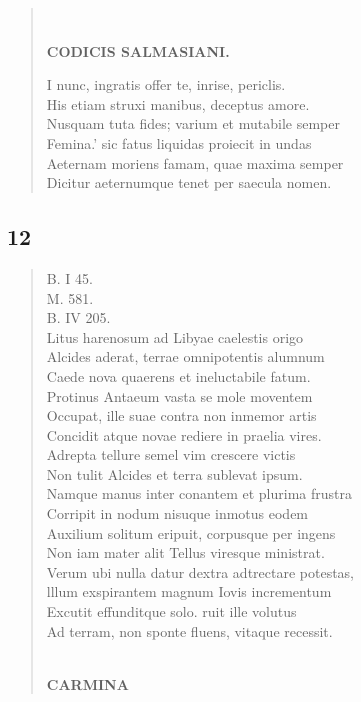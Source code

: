 \documentclass[11pt, a4paper]{report}
\begin{document}
\begin{verse}
        ﻿\pagebreak 
    \begin{center} \textbf{CODICIS SALMASIANI.} \end{center} \marginpar{[47]} I nunc, ingratis offer te, inrise, periclis. \\ His etiam struxi manibus, deceptus amore. \\ Nusquam tuta fides; varium et mutabile semper \\ Femina.’ sic fatus liquidas proiecit in undas \\ Aeternam moriens famam, quae maxima semper \\ Dicitur aeternumque tenet per saecula nomen. \\ 
      \end{verse}
  
            \subsection*{12}
      \begin{verse}
      B. I 45. \\ M. 581. \\ B. IV 205. \\ Litus harenosum  \lbrack ad \rbrack  Libyae caelestis origo \\ Alcides aderat, terrae omnipotentis alumnum \\ Caede nova quaerens et ineluctabile fatum. \\ Protinus Antaeum vasta se mole moventem \\ Occupat, ille suae contra non inmemor artis \\ Concidit atque novae rediere in praelia vires. \\ Adrepta tellure semel vim crescere victis \\ Non tulit Alcides et terra sublevat ipsum. \\ Namque manus inter conantem et plurima frustra \\ Corripit in nodum nisuque inmotus eodem \\ Auxilium solitum eripuit, corpusque per ingens \\ Non iam mater alit Tellus viresque ministrat. \\ Verum ubi nulla datur dextra adtrectare potestas, \\ lllum exspirantem magnum Iovis incrementum \\ Excutit effunditque solo. ruit ille volutus \\ Ad terram, non sponte fluens, vitaque recessit. \\ 
        ﻿\pagebreak 
    \begin{center} \textbf{CARMINA} \end{center}
      \end{verse}
  
\end{document}

